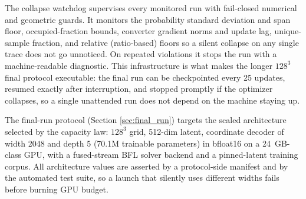 The collapse watchdog supervises every monitored run with fail-closed numerical and geometric guards. It monitors the probability standard deviation and span floor, occupied-fraction bounds, converter gradient norms and update lag, unique-sample fraction, and relative (ratio-based) floors so a silent collapse on any single trace does not go unnoticed. On repeated violations it stops the run with a machine-readable diagnostic. This infrastructure is what makes the longer \(128^3\) final protocol executable: the final run can be checkpointed every 25 updates, resumed exactly after interruption, and stopped promptly if the optimizer collapses, so a single unattended run does not depend on the machine staying up.

The final-run protocol (Section \ref{sec:final_run}) targets the scaled architecture selected by the capacity law: \(128^3\) grid, 512-dim latent, coordinate decoder of width 2048 and depth 5 (70.1M trainable parameters) in bfloat16 on a 24~GB-class GPU, with a fused-stream BFL solver backend and a pinned-latent training corpus. All architecture values are asserted by a protocol-side manifest and by the automated test suite, so a launch that silently uses different widths fails before burning GPU budget.
